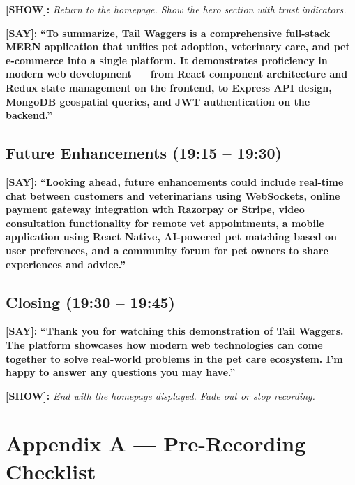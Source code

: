 \documentclass[12pt,a4paper]{article}
\newcommand{\say}[1]{\textbf{\textcolor{narration}{[SAY]:}} \textbf{``#1''}}
\newcommand{\show}[1]{\textbf{\textcolor{screen}{[SHOW]:}} \textit{#1}}
\begin{document}
\show{Return to the homepage. Show the hero section with trust indicators.}

\say{To summarize, Tail Waggers is a comprehensive full-stack MERN application that unifies pet adoption, veterinary care, and pet e-commerce into a single platform. It demonstrates proficiency in modern web development --- from React component architecture and Redux state management on the frontend, to Express API design, MongoDB geospatial queries, and JWT authentication on the backend.}

\subsection{Future Enhancements (19:15 -- 19:30)}

\say{Looking ahead, future enhancements could include real-time chat between customers and veterinarians using WebSockets, online payment gateway integration with Razorpay or Stripe, video consultation functionality for remote vet appointments, a mobile application using React Native, AI-powered pet matching based on user preferences, and a community forum for pet owners to share experiences and advice.}

\subsection{Closing (19:30 -- 19:45)}

\say{Thank you for watching this demonstration of Tail Waggers. The platform showcases how modern web technologies can come together to solve real-world problems in the pet care ecosystem. I'm happy to answer any questions you may have.}

\show{End with the homepage displayed. Fade out or stop recording.}

\newpage

\section*{Appendix A --- Pre-Recording Checklist}
\end{document}
